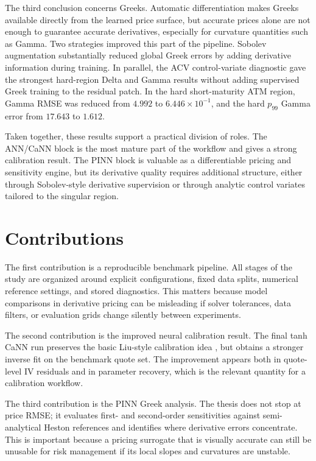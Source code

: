 The third conclusion concerns Greeks. Automatic differentiation makes Greeks available directly from the learned price surface, but accurate prices alone are not enough to guarantee accurate derivatives, especially for curvature quantities such as Gamma. Two strategies improved this part of the pipeline. Sobolev augmentation \cite{czarnecki2017sobolev} substantially reduced global Greek errors by adding derivative information during training. In parallel, the ACV control-variate diagnostic gave the strongest hard-region Delta and Gamma results without adding supervised Greek training to the residual patch. In the hard short-maturity ATM region, Gamma RMSE was reduced from \(4.992\) to \(6.446\times10^{-1}\), and the hard \(p_{99}\) Gamma error from \(17.643\) to \(1.612\).

Taken together, these results support a practical division of roles. The ANN/CaNN block is the most mature part of the workflow and gives a strong calibration result. The PINN block is valuable as a differentiable pricing and sensitivity engine, but its derivative quality requires additional structure, either through Sobolev-style derivative supervision or through analytic control variates tailored to the singular region.

\section{Contributions}

The first contribution is a reproducible benchmark pipeline. All stages of the study are organized around explicit configurations, fixed data splits, numerical reference settings, and stored diagnostics. This matters because model comparisons in derivative pricing can be misleading if solver tolerances, data filters, or evaluation grids change silently between experiments.

The second contribution is the improved neural calibration result. The final tanh CaNN run preserves the basic Liu-style calibration idea \cite{liu}, but obtains a stronger inverse fit on the benchmark quote set. The improvement appears both in quote-level IV residuals and in parameter recovery, which is the relevant quantity for a calibration workflow.

The third contribution is the PINN Greek analysis. The thesis does not stop at price RMSE; it evaluates first- and second-order sensitivities against semi-analytical Heston references and identifies where derivative errors concentrate. This is important because a pricing surrogate that is visually accurate can still be unusable for risk management if its local slopes and curvatures are unstable.

